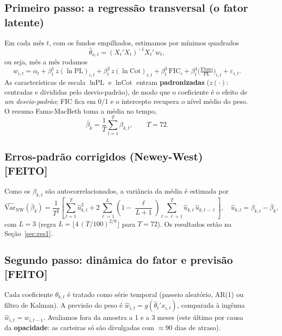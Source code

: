 \documentclass[11pt,a4paper]{article}
\newcommand{\feito}{\textcolor{feitog}{\textbf{[FEITO]}}}
\begin{document}
\subsection{Primeiro passo: a regressão transversal (o fator latente)}
Em cada mês $t$, com os fundos empilhados, estimamos por mínimos quadrados
\begin{equation}
\widehat{\theta}_{n,t} = (X_t'X_t)^{-1}X_t'\,w_t,
\label{eq:ols}
\end{equation}
ou seja, mês a mês rodamos
\begin{equation}
w_{i,t} = \alpha_t + \beta^{1}_t\,z(\ln\text{PL})_{i,t} + \beta^{2}_t\,z(\ln\text{Cot})_{i,t}
        + \beta^{3}_t\,\text{FIC}_i + \beta^{4}_t\Big(\tfrac{\text{Fluxo}}{\text{PL}}\Big)_{i,t}
        + \varepsilon_{i,t}.
\label{eq:cs}
\end{equation}
As características de escala $\ln\text{PL}$ e $\ln\text{Cot}$ entram \textbf{padronizadas}
($z(\cdot)$: centradas e divididas pelo desvio-padrão), de modo que o coeficiente é o efeito de
\emph{um desvio-padrão}; FIC fica em 0/1 e o intercepto recupera o nível médio do peso. O resumo
Fama-MacBeth toma a média no tempo,
\begin{equation}
\bar{\beta}_k = \frac{1}{T}\sum_{t=1}^{T}\beta_{k,t}, \qquad T=72.
\label{eq:fm}
\end{equation}

\subsection{Erros-padrão corrigidos (Newey-West) \feito}
Como os $\beta_{k,t}$ são autocorrelacionados, a variância da média é estimada por
\begin{equation}
\widehat{\mathrm{Var}}_{\text{NW}}(\bar{\beta}_k) = \frac{1}{T^{2}}\!\left[
\sum_{t=1}^{T}\widehat{u}_{k,t}^{2}
+ 2\sum_{\ell=1}^{L}\!\left(1-\frac{\ell}{L+1}\right)\!\sum_{t=\ell+1}^{T}\widehat{u}_{k,t}\,\widehat{u}_{k,t-\ell}
\right], \quad \widehat{u}_{k,t}=\beta_{k,t}-\bar{\beta}_k,
\label{eq:nw}
\end{equation}
com $L=3$ (regra $L=\lfloor 4\,(T/100)^{2/9}\rfloor$ para $T=72$). Os resultados estão na
Seção~\ref{sec:res1}.

\subsection{Segundo passo: dinâmica do fator e previsão \feito}
Cada coeficiente $\theta_{k,t}$ é tratado como série temporal (passeio aleatório, AR(1) ou filtro
de Kalman). A previsão do peso é $\widehat{w}_{i,t}=g(\widehat{\theta}_t'x_{i,t})$, comparada à
ingênua $\widehat{w}_{i,t}=w_{i,t-1}$. Avaliamos fora da amostra a 1 e a 3 meses (este último por
causa da \textbf{opacidade}: as carteiras só são divulgadas com $\approx$90 dias de atraso).
\end{document}
